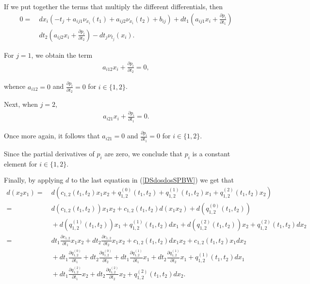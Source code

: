 \documentclass{amsart}
\theoremstyle{definition}
\theoremstyle{remark}
\numberwithin{equation}{section}
\begin{document}
If we put together the terms that multiply the different differentials, then 
\begin{align*}
0 = &\ dx_i(-t_j+a_{ij1}\nu_{x_i}(t_1)+a_{ij2}\nu_{x_i}(t_2)+b_{ij})+dt_1\left(a_{ij1}x_i+\frac{\partial p_i}{\partial t_1}\right) \\
&\ dt_2\left(a_{ij2}x_i+\frac{\partial p_i}{\partial t_2}\right) -dt_j\nu_{t_j}(x_i).
\end{align*}

For $j=1$, we obtain the term
\begin{align*}
    a_{i12}x_i+\frac{\partial p_i}{\partial t_2} = 0,
\end{align*} 

whence $a_{i12} = 0$ and $\frac{\partial p_i}{\partial t_2} = 0$ for $i \in \{1, 2\}$.

Next, when $j=2$,
\begin{align*}
    a_{i21}x_i+\frac{\partial p_i}{\partial t_1} = 0. 
\end{align*}

Once more again, it follows that $a_{i21}=0$ and $\frac{\partial p_i}{\partial t_1} = 0$ for $i \in \{1, 2\}$.

Since the partial derivatives of $p_i$ are zero, we conclude that $p_i$ is a constant element for $i \in \{1, 2\}$.

Finally, by applying $d$ to the last equation in {\rm (}\ref{DSdosdosSPBW}{\rm )} we get that
\begin{align*}
    d(x_2 x_1) = &\ d(c_{1, 2}(t_1, t_2)x_1 x_2 + q_{1,2}^{(0)}(t_1, t_2) + q_{1,2}^{(1)}(t_1, t_2)x_1 + q_{1,2}^{(2)}(t_1, t_2)x_2) \\
    = &\ d(c_{1,2}(t_1, t_2))x_1x_2+c_{1, 2}(t_1, t_2)d(x_1x_2)+d(q_{1,2}^{(0)}(t_1, t_2)) \\
     &\ + d(q_{1,2}^{(1)}(t_1, t_2))x_1 + q_{1,2}^{(1)}(t_1, t_2)dx_1+d(q_{1,2}^{(2)}(t_1, t_2))x_2+q_{1,2}^{(2)}(t_1, t_2)dx_2 \\
     = &\ dt_1\frac{\partial c_{1,2}}{\partial t_1}x_1x_2+dt_2\frac{\partial c_{1,2}}{\partial t_2}x_1x_2+c_{1,2}(t_1, t_2)dx_1x_2+c_{1,2}(t_1, t_2)x_1dx_2 \\
     &\ + dt_1\frac{\partial q_{1,2}^{(0)}}{\partial t_1}+dt_2\frac{\partial q_{1,2}^{(0)}}{\partial t_2}+dt_1\frac{\partial q_{1,2}^{(1)}}{\partial t_1}x_1+dt_2\frac{\partial q_{1,2}^{(1)}}{\partial t_2}x_1+q_{1,2}^{(1)}(t_1, t_2)dx_1 \\
     &\ +dt_1\frac{\partial q_{1,2}^{(2)}}{\partial t_1}x_2+dt_2\frac{\partial q_{1,2}^{(2)}}{\partial t_2}x_2+q_{1,2}^{(2)}(t_1, t_2)dx_2.
\end{align*}
\end{document}
